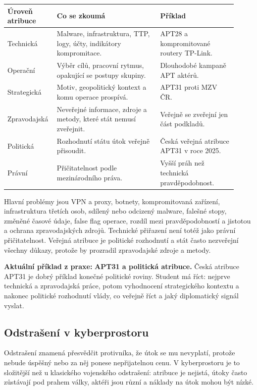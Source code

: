 \documentclass[11pt,a4paper]{article}
\newcommand{\aktualni}[1]{\begin{tcolorbox}[breakable,enhanced,colback=green!10,colframe=green!35!black,boxrule=0pt,arc=1mm,left=5pt,right=5pt,top=5pt,bottom=5pt,before skip=6pt,after skip=6pt]\textbf{Aktuální příklad z praxe:} #1\end{tcolorbox}}
\begin{document}
\begin{longtable}{p{0.17\linewidth}p{0.43\linewidth}p{0.32\linewidth}}
\toprule
\textbf{Úroveň atribuce} & \textbf{Co se zkoumá} & \textbf{Příklad}\\
\midrule
Technická & Malware, infrastruktura, TTP, logy, účty, indikátory kompromitace. & APT28 a kompromitované routery TP-Link.\\
Operační & Výběr cílů, pracovní rytmus, opakující se postupy skupiny. & Dlouhodobé kampaně APT aktérů.\\
Strategická & Motiv, geopolitický kontext a komu operace prospívá. & APT31 proti MZV ČR.\\
Zpravodajská & Neveřejné informace, zdroje a metody, které stát nemusí zveřejnit. & Veřejně se zveřejní jen část podkladů.\\
Politická & Rozhodnutí státu útok veřejně přisoudit. & Česká veřejná atribuce APT31 v roce 2025.\\
Právní & Přičitatelnost podle mezinárodního práva. & Vyšší práh než technická pravděpodobnost.\\
\bottomrule
\end{longtable}

Hlavní problémy jsou VPN a proxy, botnety, kompromitovaná zařízení, infrastruktura třetích osob, sdílený nebo odcizený malware, falešné stopy, změněné časové údaje, false flag operace, rozdíl mezi pravděpodobností a jistotou a ochrana zpravodajských zdrojů. Technické přiřazení není totéž jako právní přičitatelnost. Veřejná atribuce je politické rozhodnutí a stát často nezveřejní všechny důkazy, protože by prozradil zpravodajské zdroje a metody.

\aktualni{\textbf{APT31 a politická atribuce.} Česká atribuce APT31 je dobrý příklad konečné politické roviny. Student má říct: nejprve technická a zpravodajská práce, potom vyhodnocení strategického kontextu a nakonec politické rozhodnutí vlády, co veřejně říct a jaký diplomatický signál vyslat.}

\subsection*{Odstrašení v kyberprostoru}
Odstrašení znamená přesvědčit protivníka, že útok se mu nevyplatí, protože nebude úspěšný nebo za něj ponese nepřijatelnou cenu. V kyberprostoru je to složitější než u klasického vojenského odstrašení: atribuce je nejistá, útoky často zůstávají pod prahem války, aktéři jsou různí a náklady na útok mohou být nízké.
\end{document}
